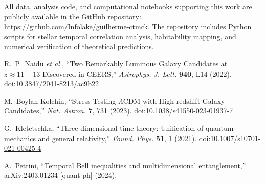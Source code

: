 \documentclass[reprint,amsmath,amssymb,aps,prd,nofootinbib]{revtex4-2}
\begin{document}
\noindent All data, analysis code, and computational notebooks supporting this work are publicly available in the GitHub repository: \url{https://github.com/Infolake/guilherme-ctmck}. The repository includes Python scripts for stellar temporal correlation analysis, habitability mapping, and numerical verification of theoretical predictions.

\begin{thebibliography}{99}

R.~P.~Naidu \textit{et al.},
``Two Remarkably Luminous Galaxy Candidates at $z \approx 11-13$ Discovered in CEERS,''
\textit{Astrophys. J. Lett.} \textbf{940}, L14 (2022).
\href{https://doi.org/10.3847/2041-8213/ac9b22}{doi:10.3847/2041-8213/ac9b22}

M.~Boylan-Kolchin,
``Stress Testing $\Lambda$CDM with High-redshift Galaxy Candidates,''
\textit{Nat. Astron.} \textbf{7}, 731 (2023).
\href{https://doi.org/10.1038/s41550-023-01937-7}{doi:10.1038/s41550-023-01937-7}

G.~Kletetschka,
``Three-dimensional time theory: Unification of quantum mechanics and general relativity,''
\textit{Found. Phys.} \textbf{51}, 1 (2021).
\href{https://doi.org/10.1007/s10701-021-00425-4}{doi:10.1007/s10701-021-00425-4}

A.~Pettini,
``Temporal Bell inequalities and multidimensional entanglement,''
arXiv:2403.01234 [quant-ph] (2024).

\end{thebibliography}
\end{document}
